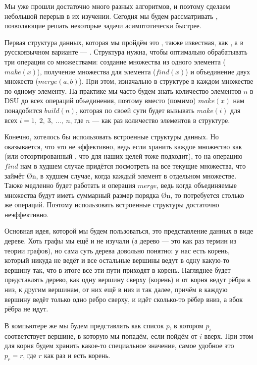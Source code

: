 Мы уже прошли достаточно много разных алгоритмов, и поэтому сделаем небольшой перерыв в их изучении. Сегодня мы будем рассматривать , позволяющие решать некоторые задачи асимптотически быстрее.


Первая структура данных, которая мы пройдём это , также известная, как , а в русскоязычном варианте — . Структура нужна, чтобы оптимально обрабатывать три операции со множествами: создание множества из одного элемента ($make(x)$), получение множества для элемента ($find(x)$) и объединение двух множеств ($merge(a, b)$). При этом, изначально в структуре в каждом множестве по одному элементу. На практике мы часто будем знать количество элементов $n$ в DSU до всех операций объединения, поэтому вместо (помимо) $make(x)$ нам понадобится $build(n)$, которая по своей сути будет вызывать $make(i)$ для всех $i = 1,\ 2,\ 3,\ \ldots,\ n$, где $n$ — как раз количество элементов в структуре.

Конечно, хотелось бы использовать встроенные структуры данных. Но оказывается, что это не эффективно, ведь если хранить каждое множество как  (или отсортированный , что для наших целей тоже подходит), то на операцию $find$ нам в худшем случае придётся посмотреть на все текущие множества, что займёт \O{n}, в худшем случае, когда каждый элемент в отдельном множестве. Также медленно будет работать и операция $merge$, ведь когда объединяемые множества будут иметь суммарный размер порядка \O{n}, то потребуется столько же операций. Поэтому использовать встроенные структуры достаточно неэффективно.

Основная идея, которой мы будем пользоваться, это представление данных в виде дереве. Хоть графы мы ещё и не изучали (а дерево — это как раз термин из теории графов), но сама суть дерева довольно понятно: у нас есть корень, который никуда не ведёт и все остальные вершины ведут в одну какую-то вершину так, что в итоге все эти пути приходят в корень. Нагляднее будет представлять дерево, как одну вершину сверху (корень) и от корня ведут рёбра в низ, к другим вершинам, от них ещё в низ и так далее, причём в каждую вершину ведёт только одно ребро сверху, и идёт сколько-то рёбер вниз, а вбок рёбра не идут.

В компьютере же мы будем представлять как список $p$, в котором $p_i$ соответствует вершине, в которую мы попадём, если пойдём от $i$ вверх. При этом для корня будем хранить какое-то специальное значение, самое удобное это $p_r = r$, где $r$ как раз и есть корень.

